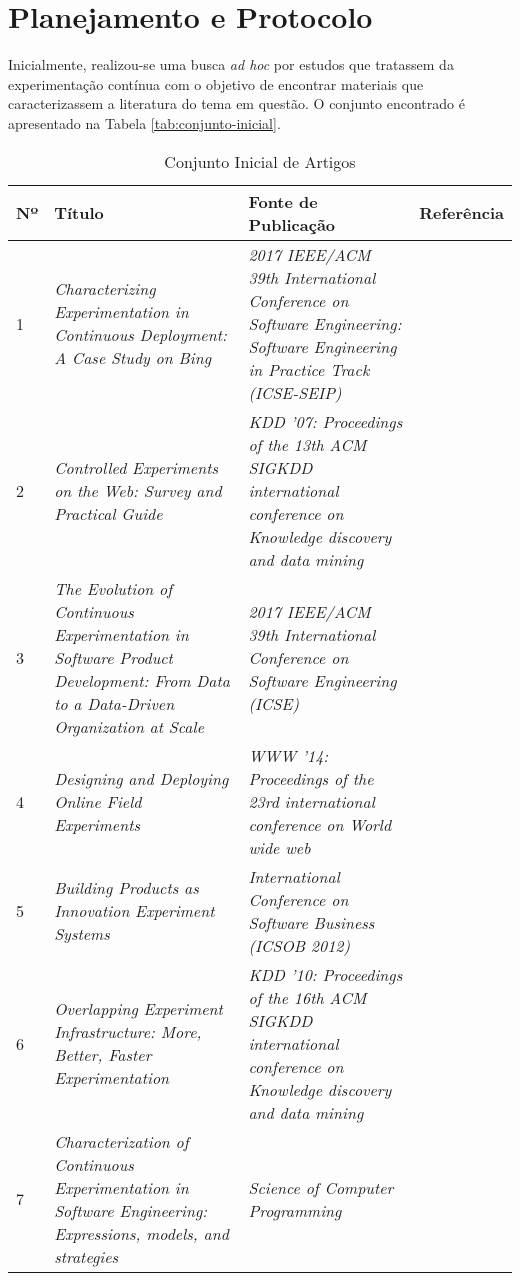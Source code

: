 \section{Planejamento e Protocolo}
\label{sec:rsl-protocolo}

Inicialmente, realizou-se uma busca \textit{ad hoc} por estudos que tratassem da experimentação contínua com o objetivo de encontrar materiais que caracterizassem a literatura do tema em questão. O conjunto encontrado é apresentado na Tabela \ref{tab:conjunto-inicial}.


\begin{table}[]
\centering
\caption{Conjunto Inicial de Artigos}
    \begin{tabular}{|p{.5cm}|p{6cm}|p{6cm}|p{1.75cm}|}
        \hline
        Nº & Título & Fonte de Publicação & Referência \\ \hline
        1 & \textit{Characterizing Experimentation in Continuous Deployment: A Case Study on Bing} & \textit{2017 IEEE/ACM 39th International Conference on Software Engineering: Software Engineering in Practice Track (ICSE-SEIP)} & \cite{kevic_characterizing_2017} \\ \hline
        2 & \textit{Controlled Experiments on the Web: Survey and Practical Guide} & \textit{KDD '07: Proceedings of the 13th ACM SIGKDD international conference on Knowledge discovery and data mining} & \cite{kohavi_controlled_2009} \\  \hline
        3 & \textit{The Evolution of Continuous Experimentation in Software Product Development: From Data to a Data-Driven Organization at Scale} & \textit{2017 IEEE/ACM 39th International Conference on Software Engineering (ICSE)} & \cite{fabijan_evolution_2017} \\ \hline
        4 & \textit{Designing and Deploying Online Field Experiments} & \textit{WWW '14: Proceedings of the 23rd international conference on World wide web} & \cite{bakshy_designing_2014} \\ \hline
        5 & \textit{Building Products as Innovation Experiment Systems} & \textit{International Conference on Software Business (ICSOB 2012)} & \cite{van_der_aalst_building_2012} \\ \hline
        6 & \textit{Overlapping Experiment Infrastructure: More, Better, Faster Experimentation} & \textit{KDD '10: Proceedings of the 16th ACM SIGKDD international conference on Knowledge discovery and data mining} & \cite{tang_overlapping_2010} \\ \hline
        7 & \textit{Characterization of Continuous Experimentation in Software Engineering: Expressions, models, and strategies} & \textit{Science of Computer Programming} & \cite{erthal_characterization_2023} \\ \hline
    \end{tabular}


\end{table}

